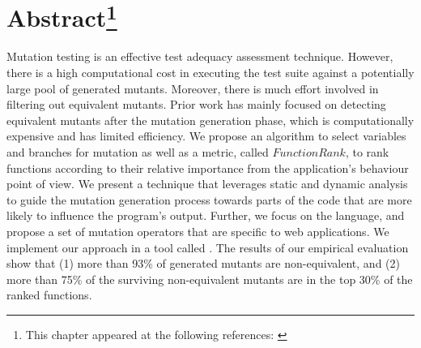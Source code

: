 \section*{Abstract\footnote{This chapter appeared at the following references: \cite{mirshokraie:icst13, mirshokraie:tse15}}}
Mutation testing is an effective test adequacy assessment technique. However, there is a high computational cost in executing the test suite against a potentially large pool of generated mutants. Moreover, there is much effort involved in filtering out equivalent mutants. Prior work has mainly focused on detecting equivalent mutants after the mutation generation phase, which is computationally expensive and has limited efficiency. We propose an algorithm to select variables and branches for mutation as well as a metric, called $FunctionRank$, to rank functions according to their relative importance from the application's behaviour point of view. We present a technique that leverages static and dynamic analysis to guide the mutation generation process towards parts of the code that are more likely to influence the program's output. Further, we focus on the \javascript language, and propose a set of mutation operators that are specific to web applications. We implement our approach in a tool called \mutandis. The results of our empirical evaluation show that 
(1) more than 93\% of generated mutants are non-equivalent, 
and (2) more than 75\% of the surviving non-equivalent mutants
are in the top 30\% of the ranked functions.
